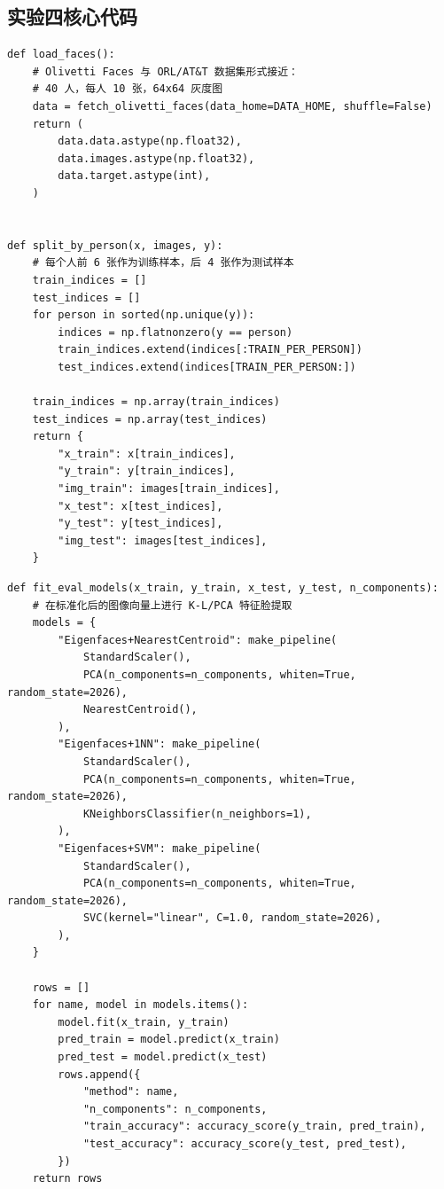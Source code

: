 \documentclass[UTF8,a4paper,12pt]{ctexart}
\begin{document}
\subsection{实验四核心代码}

\begin{lstlisting}[caption={Exp.4 face dataset split for Eigenfaces},label={lst:exp4-face-split}]
def load_faces():
    # Olivetti Faces 与 ORL/AT&T 数据集形式接近：
    # 40 人，每人 10 张，64x64 灰度图
    data = fetch_olivetti_faces(data_home=DATA_HOME, shuffle=False)
    return (
        data.data.astype(np.float32),
        data.images.astype(np.float32),
        data.target.astype(int),
    )


def split_by_person(x, images, y):
    # 每个人前 6 张作为训练样本，后 4 张作为测试样本
    train_indices = []
    test_indices = []
    for person in sorted(np.unique(y)):
        indices = np.flatnonzero(y == person)
        train_indices.extend(indices[:TRAIN_PER_PERSON])
        test_indices.extend(indices[TRAIN_PER_PERSON:])

    train_indices = np.array(train_indices)
    test_indices = np.array(test_indices)
    return {
        "x_train": x[train_indices],
        "y_train": y[train_indices],
        "img_train": images[train_indices],
        "x_test": x[test_indices],
        "y_test": y[test_indices],
        "img_test": images[test_indices],
    }
\end{lstlisting}

\begin{lstlisting}[caption={Exp.4 Eigenfaces feature extraction and classifiers},label={lst:exp4-face-classifier}]
def fit_eval_models(x_train, y_train, x_test, y_test, n_components):
    # 在标准化后的图像向量上进行 K-L/PCA 特征脸提取
    models = {
        "Eigenfaces+NearestCentroid": make_pipeline(
            StandardScaler(),
            PCA(n_components=n_components, whiten=True, random_state=2026),
            NearestCentroid(),
        ),
        "Eigenfaces+1NN": make_pipeline(
            StandardScaler(),
            PCA(n_components=n_components, whiten=True, random_state=2026),
            KNeighborsClassifier(n_neighbors=1),
        ),
        "Eigenfaces+SVM": make_pipeline(
            StandardScaler(),
            PCA(n_components=n_components, whiten=True, random_state=2026),
            SVC(kernel="linear", C=1.0, random_state=2026),
        ),
    }

    rows = []
    for name, model in models.items():
        model.fit(x_train, y_train)
        pred_train = model.predict(x_train)
        pred_test = model.predict(x_test)
        rows.append({
            "method": name,
            "n_components": n_components,
            "train_accuracy": accuracy_score(y_train, pred_train),
            "test_accuracy": accuracy_score(y_test, pred_test),
        })
    return rows
\end{lstlisting}
\end{document}
